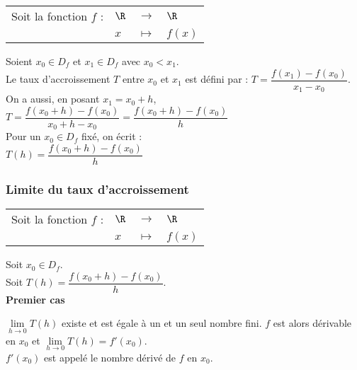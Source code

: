 \begin{tabular}{llll}
Soit la fonction $f$ : & $\R$ & $\longrightarrow$ & $\R$ \\
& $x$ & $\longmapsto$ & $f\left(x\right)$ \\
\end{tabular}

\vspace*{.3cm}

Soient $x_0 \in D_f $ et $x_1 \in D_f$ avec $x_0 < x_1$.  \\

Le taux d'accroissement $T$ entre $x_0$ et $x_1$ est défini par : $T = \dfrac{f(x_1) - f(x_0)}{x_1 - x_0}$. \\

On a aussi, en posant $x_1 = x_0 + h$, \\

$T = \dfrac{f(x_0 + h) - f(x_0)}{x_0 + h - x_0} =\dfrac{f(x_0 + h) - f(x_0)}{h}$ \\

Pour un $x_0 \in D_f$ fixé, on écrit : \\

$T(h) = \dfrac{f(x_0 + h) - f(x_0)}{h}$ 

\subsubsection{Limite du taux d'accroissement}

\begin{tabular}{llll}
Soit la fonction $f$ : & $\R$ & $\longrightarrow$ & $\R$ \\
& $x$ & $\longmapsto$ & $f\left(x\right)$ \\
\end{tabular}

\vspace*{.3cm}

Soit $x_0 \in D_f$. \\

Soit $T(h) = \dfrac{f(x_0 + h) - f(x_0)}{h}$. \\

\textbf{Premier cas}

$\lim\limits_{h \to 0} T(h)$ existe et est égale à un et un seul nombre fini. $f$ est alors dérivable en $x_0$ et $\lim\limits_{h \to 0} T(h) = f'(x_0)$. \\

$f'(x_0)$ est appelé le nombre dérivé de $f$ en $x_0$. \\

